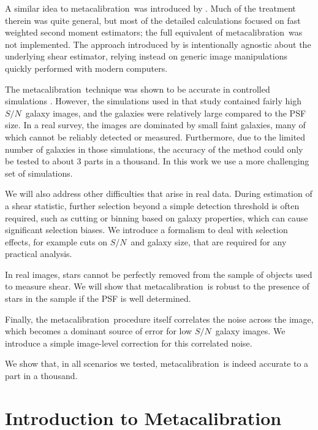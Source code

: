 \documentclass[iop]{emulateapj}
\newcommand{\snr}{$S/N$}
\newcommand{\mcal}{metacalibration}
\begin{document}
A similar idea to \mcal\ was introduced by \cite{Kaiser2000}.  Much of the
treatment therein was quite general, but most of the detailed calculations
focused on fast weighted second moment estimators; the full equivalent of
\mcal\ was not implemented.  The approach introduced by \citep{HuffMcal} is
intentionally agnostic about the underlying shear estimator, relying instead on
generic image manipulations quickly performed with modern computers. 

The \mcal\ technique was shown to be accurate in controlled simulations
\citep{HuffMcal}.  However, the simulations used in that study \citep[based on
those used in][]{great3} contained fairly high \snr\ galaxy images, and the
galaxies were relatively large compared to the PSF size.  In a real survey, the
images are dominated by small faint galaxies, many of which cannot be reliably
detected or measured.  Furthermore, due to the limited number of galaxies in
those simulations, the accuracy of the method could only be tested to about 3
parts in a thousand.  In this work we use a more challenging set of
simulations.

We will also address other difficulties that arise in real data.  During
estimation of a shear statistic, further selection beyond a simple detection
threshold is often required, such as cutting or binning based on galaxy
properties, which can cause significant selection biases.  We introduce a
formalism to deal with selection effects, for example cuts on \snr\ and galaxy
size, that are required for any practical analysis. 

In real images, stars cannot be perfectly removed from the sample of objects
used to measure shear. We will show that \mcal\ is robust to the presence of
stars in the sample if the PSF is well determined.


Finally, the \mcal\ procedure itself correlates the noise across the image,
which becomes a dominant source of error for low \snr\ galaxy images.  We
introduce a simple image-level correction for this correlated noise.

We show that, in all scenarios we tested, \mcal\ is indeed accurate to a part
in a thousand.

\section{Introduction to Metacalibration} \label{sec:mcal}
\end{document}
